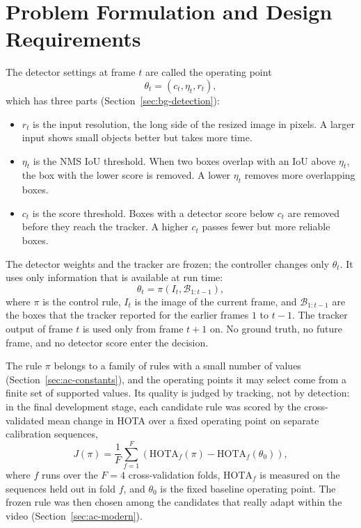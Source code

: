 \section{Problem Formulation and Design Requirements}\label{sec:ac-problem}
The detector settings at frame $t$ are called the operating point
\begin{equation}
\theta_t = (c_t, \eta_t, r_t),
\label{eq:ac-theta}
\end{equation}
which has three parts (Section~\ref{sec:bg-detection}):
\begin{itemize}
\item $r_t$ is the input resolution, the long side of the resized image in pixels. A larger input shows small objects better but takes more time.
\item $\eta_t$ is the NMS IoU threshold. When two boxes overlap with an IoU above $\eta_t$, the box with the lower score is removed. A lower $\eta_t$ removes more overlapping boxes.
\item $c_t$ is the score threshold. Boxes with a detector score below $c_t$ are removed before they reach the tracker. A higher $c_t$ passes fewer but more reliable boxes.
\end{itemize}
The detector weights and the tracker are frozen; the controller changes only $\theta_t$. It uses only information that is available at run time:
\begin{equation}
\theta_t = \pi\left(I_t, \mathcal{B}_{1:t-1}\right),
\label{eq:ac-policy}
\end{equation}
where $\pi$ is the control rule, $I_t$ is the image of the current frame, and $\mathcal{B}_{1:t-1}$ are the boxes that the tracker reported for the earlier frames $1$ to $t-1$. The tracker output of frame $t$ is used only from frame $t+1$ on. No ground truth, no future frame, and no detector score enter the decision.

The rule $\pi$ belongs to a family of rules with a small number of values (Section~\ref{sec:ac-constants}), and the operating points it may select come from a finite set of supported values. Its quality is judged by tracking, not by detection: in the final development stage, each candidate rule was scored by the cross-validated mean change in HOTA over a fixed operating point on separate calibration sequences,
\begin{equation}
J(\pi)=\frac{1}{F}\sum_{f=1}^{F}\left(\mathrm{HOTA}_f(\pi)-\mathrm{HOTA}_f(\theta_0)\right),
\label{eq:ac-objective}
\end{equation}
where $f$ runs over the $F=4$ cross-validation folds, $\mathrm{HOTA}_f$ is measured on the sequences held out in fold $f$, and $\theta_0$ is the fixed baseline operating point. The frozen rule was then chosen among the candidates that really adapt within the video (Section~\ref{sec:ac-modern}).

